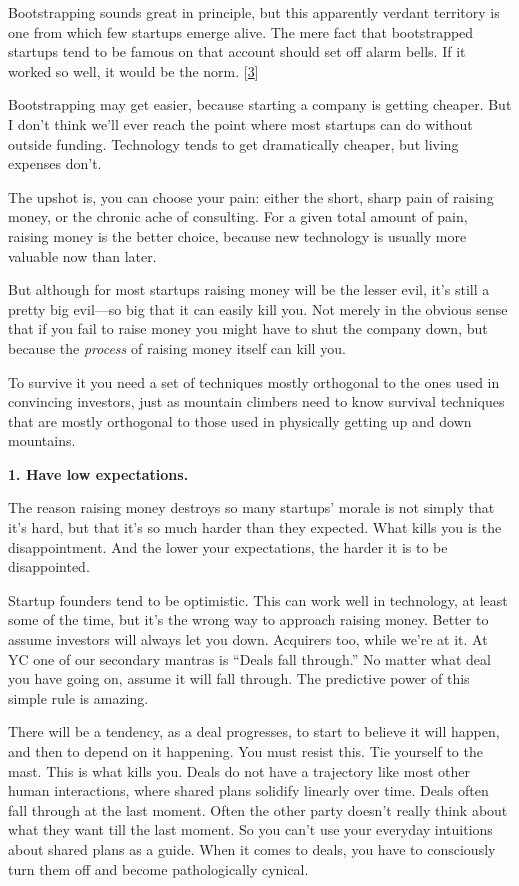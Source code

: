 Bootstrapping sounds great in principle, but this apparently verdant
territory is one from which few startups emerge alive. The mere fact
that bootstrapped startups tend to be famous on that account should set
off alarm bells. If it worked so well, it would be the norm.
{[}\hyperref[f3n]{3}{]}

Bootstrapping may get easier, because starting a company is getting
cheaper. But I don't think we'll ever reach the point where most
startups can do without outside funding. Technology tends to get
dramatically cheaper, but living expenses don't.

The upshot is, you can choose your pain: either the short, sharp pain of
raising money, or the chronic ache of consulting. For a given total
amount of pain, raising money is the better choice, because new
technology is usually more valuable now than later.

But although for most startups raising money will be the lesser evil,
it's still a pretty big evil---so big that it can easily kill you. Not
merely in the obvious sense that if you fail to raise money you might
have to shut the company down, but because the \emph{process} of raising
money itself can kill you.

To survive it you need a set of techniques mostly orthogonal to the ones
used in convincing investors, just as mountain climbers need to know
survival techniques that are mostly orthogonal to those used in
physically getting up and down mountains.

\textbf{1. Have low expectations.}

The reason raising money destroys so many startups' morale is not simply
that it's hard, but that it's so much harder than they expected. What
kills you is the disappointment. And the lower your expectations, the
harder it is to be disappointed.

Startup founders tend to be optimistic. This can work well in
technology, at least some of the time, but it's the wrong way to
approach raising money. Better to assume investors will always let you
down. Acquirers too, while we're at it. At YC one of our secondary
mantras is ``Deals fall through.'' No matter what deal you have going
on, assume it will fall through. The predictive power of this simple
rule is amazing.

There will be a tendency, as a deal progresses, to start to believe it
will happen, and then to depend on it happening. You must resist this.
Tie yourself to the mast. This is what kills you. Deals do not have a
trajectory like most other human interactions, where shared plans
solidify linearly over time. Deals often fall through at the last
moment. Often the other party doesn't really think about what they want
till the last moment. So you can't use your everyday intuitions about
shared plans as a guide. When it comes to deals, you have to consciously
turn them off and become pathologically cynical.

